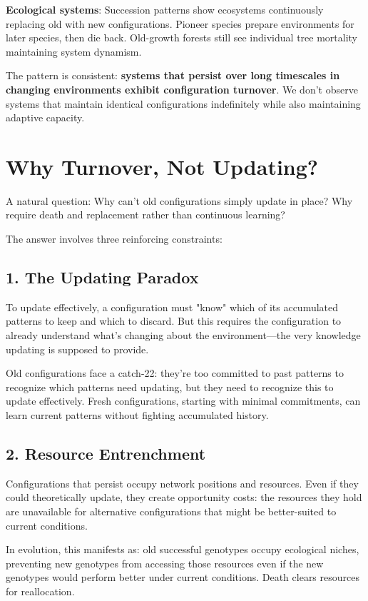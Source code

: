 \textbf{Ecological systems}: Succession patterns show ecosystems continuously replacing old with new configurations. Pioneer species prepare environments for later species, then die back. Old-growth forests still see individual tree mortality maintaining system dynamism.

The pattern is consistent: \textbf{systems that persist over long timescales in changing environments exhibit configuration turnover}. We don't observe systems that maintain identical configurations indefinitely while also maintaining adaptive capacity.

\section{Why Turnover, Not Updating?}

A natural question: Why can't old configurations simply update in place? Why require death and replacement rather than continuous learning?

The answer involves three reinforcing constraints:

\subsection{1. The Updating Paradox}

To update effectively, a configuration must "know" which of its accumulated patterns to keep and which to discard. But this requires the configuration to already understand what's changing about the environment—the very knowledge updating is supposed to provide.

Old configurations face a catch-22: they're too committed to past patterns to recognize which patterns need updating, but they need to recognize this to update effectively. Fresh configurations, starting with minimal commitments, can learn current patterns without fighting accumulated history.

\subsection{2. Resource Entrenchment}

Configurations that persist occupy network positions and resources. Even if they could theoretically update, they create opportunity costs: the resources they hold are unavailable for alternative configurations that might be better-suited to current conditions.

In evolution, this manifests as: old successful genotypes occupy ecological niches, preventing new genotypes from accessing those resources even if the new genotypes would perform better under current conditions. Death clears resources for reallocation.

